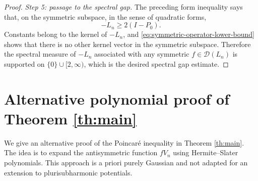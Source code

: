 \documentclass[11pt,reqno]{amsart}
\numberwithin{equation}{section}%
\numberwithin{figure}{section}%
\numberwithin{table}{section}
\theoremstyle{plain}
\theoremstyle{definition}
\begin{document}
\begin{proof}
\medskip

\noindent\emph{Step 5: passage to the spectral gap.}
The preceding form inequality says that, on the symmetric subspace, in the
sense of quadratic forms,
\begin{equation}\label{eq:symmetric-operator-lower-bound}
  -L_n\geq2(I-P_0).
\end{equation}
Constants belong to the kernel of $-L_n$, and
\eqref{eq:symmetric-operator-lower-bound} shows that there is no other kernel
vector in the symmetric subspace. Therefore the spectral measure of $-L_n$
associated with any symmetric $f\in\mathcal{D}(L_n)$ is supported on
$\{0\}\cup[2,\infty)$, which is the desired spectral gap estimate.
\end{proof}

\section{Alternative polynomial proof of Theorem \ref{th:main}}
\label{se:proof:th:main:polynomials}

We give an alternative proof of the Poincaré inequality in Theorem
\ref{th:main}. The idea is to expand the antisymmetric function $fV_n$ using
Hermite--Slater polynomials. This approach is a priori purely Gaussian and not
adapted for an extension to plurisubharmonic potentials.
\end{document}
